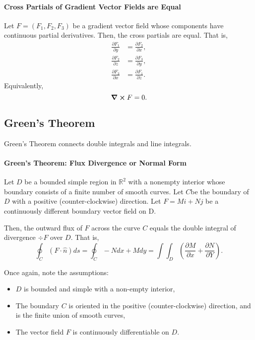 \documentclass[12pt, letterpaper]{article}
\begin{document}
    \paragraph{Cross Partials of Gradient Vector Fields are Equal}
    Let \(F = (F_1, F_2, F_3)\) be a gradient vector field whose
    components have continuous partial derivatives.
    Then, the cross partials are equal. That is,
    \begin{align*}
        \frac{\partial F_1}{\partial y} &= \frac{\partial F_2}{\partial x},\\
        \frac{\partial F_2}{\partial z} &= \frac{\partial F_3}{\partial y},\\
        \frac{\partial F_3}{\partial x} &= \frac{\partial F_1}{\partial z}.
    \end{align*}
    Equivalently,
    \[\curl F = 0.\]

    \subsection{Green's Theorem}
    Green's Theorem connects double integrals and line integrals.

    
    \paragraph{Green's Theorem: Flux Divergence or Normal Form}
    Let \(D\) be a bounded simple region in \(\mathbb{R}^2\) with a nonempty interior
    whose boundary consists of a finite number of smooth curves.
    Let \(C\)be the boundary of \(D\) with a positive (counter-clockwise) direction.
    Let \(F=Mi+Nj\) be a continuously different boundary vector field on D.

    Then, the outward flux of \(F\) across the curve \(C\) equals the double
    integral of divergence \(\div F\) over \(D\). That is,
    \[
        \oint_C (F\cdot \hat{n})ds = \oint_C -Ndx + Mdy
        = \int\int_D  \left(\frac{\partial M}{\partial x} + \frac{\partial N}{\partial Y}\right).
    \]
    
    Once again, note the assumptions:
    \begin{itemize}
        \item \(D\) is bounded and simple with a non-empty interior,
        \item The boundary \(C\) is oriented in the positive (counter-clockwise) direction,
        and is the finite union of smooth curves,
        \item The vector field \(F\) is continuously differentiable on \(D\).
    \end{itemize}
    
\end{document}
